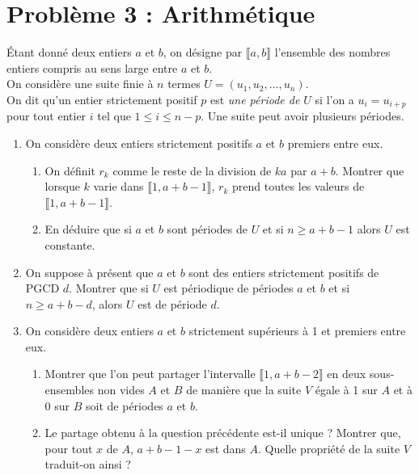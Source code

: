 \documentclass[landscape,twocolumn,leqno,a4paper,10pt]{report} %
\newcommand\n{\noindent}
\renewcommand{\geq}{\geqslant}
\renewcommand{\leq}{\leqslant}
\begin{document}
\section{Problème 3 : Arithmétique}

\n Étant donné deux entiers $a$ et $b$, on désigne par $\llbracket a, b \rrbracket$ l'ensemble des nombres entiers compris au sens large entre $a$ et $b$.\\
On considère une suite finie à $n$ termes $U=\left(u_{1}, u_{2}, \ldots, u_{n}\right)$.\\
On dit qu'un entier strictement positif $p$ est \textit{une période de $U$} si l'on a $u_{i}=u_{i+p}$ pour tout entier $i$ tel que $1 \leq i \leq n-p$. Une suite peut avoir plusieurs périodes.

\begin{enumerate}
	\item On considère deux entiers strictement positifs $a$ et $b$ premiers entre eux.
	\begin{enumerate}
		\item On définit $r_{k}$ comme le reste de la division de $k a$ par $a+b$. Montrer que lorsque $k$ varie dans $\llbracket 1, a+b-1 \rrbracket$, $r_{k}$ prend toutes les valeurs de $\llbracket 1, a+b-1 \rrbracket$.
		\item En déduire que si $a$ et $b$ sont périodes de $U$ et si $n \geq a+b-1$ alors $U$ est constante.
	\end{enumerate}
	\item On suppose à présent que $a$ et $b$ sont des entiers strictement positifs de PGCD $d$. Montrer que si $U$ est périodique de périodes $a$ et $b$ et si $n \geq a+b-d$, alors $U$ est de période $d$.
	\item On considère deux entiers $a$ et $b$ strictement supérieurs à 1 et premiers entre eux.
	\begin{enumerate}
		\item Montrer que l'on peut partager l'intervalle $\llbracket 1, a+b-2 \rrbracket$ en deux sous-ensembles non vides $A$ et $B$ de manière que la suite $V$ égale à 1 sur $A$ et à 0 sur $B$ soit de périodes $a$ et $b$.
		\item Le partage obtenu à la question précédente est-il unique ? Montrer que, pour tout $x$ de $A$, $a+b-1-x$ est dans $A$. Quelle propriété de la suite $V$ traduit-on ainsi ?
	\end{enumerate}
\end{enumerate}
\end{document}
